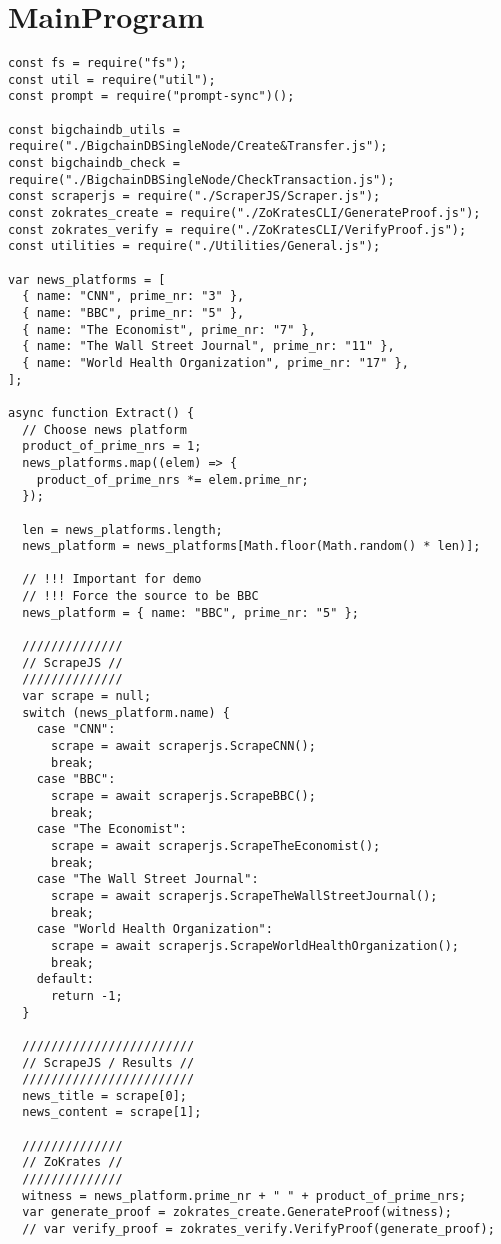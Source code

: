 \section{MainProgram}
\begin{verbatim}
const fs = require("fs");
const util = require("util");
const prompt = require("prompt-sync")();

const bigchaindb_utils = require("./BigchainDBSingleNode/Create&Transfer.js");
const bigchaindb_check = require("./BigchainDBSingleNode/CheckTransaction.js");
const scraperjs = require("./ScraperJS/Scraper.js");
const zokrates_create = require("./ZoKratesCLI/GenerateProof.js");
const zokrates_verify = require("./ZoKratesCLI/VerifyProof.js");
const utilities = require("./Utilities/General.js");

var news_platforms = [
  { name: "CNN", prime_nr: "3" },
  { name: "BBC", prime_nr: "5" },
  { name: "The Economist", prime_nr: "7" },
  { name: "The Wall Street Journal", prime_nr: "11" },
  { name: "World Health Organization", prime_nr: "17" },
];

async function Extract() {
  // Choose news platform
  product_of_prime_nrs = 1;
  news_platforms.map((elem) => {
    product_of_prime_nrs *= elem.prime_nr;
  });

  len = news_platforms.length;
  news_platform = news_platforms[Math.floor(Math.random() * len)];

  // !!! Important for demo
  // !!! Force the source to be BBC
  news_platform = { name: "BBC", prime_nr: "5" };

  //////////////
  // ScrapeJS //
  //////////////
  var scrape = null;
  switch (news_platform.name) {
    case "CNN":
      scrape = await scraperjs.ScrapeCNN();
      break;
    case "BBC":
      scrape = await scraperjs.ScrapeBBC();
      break;
    case "The Economist":
      scrape = await scraperjs.ScrapeTheEconomist();
      break;
    case "The Wall Street Journal":
      scrape = await scraperjs.ScrapeTheWallStreetJournal();
      break;
    case "World Health Organization":
      scrape = await scraperjs.ScrapeWorldHealthOrganization();
      break;
    default:
      return -1;
  }

  ////////////////////////
  // ScrapeJS / Results //
  ////////////////////////
  news_title = scrape[0];
  news_content = scrape[1];

  //////////////
  // ZoKrates //
  //////////////
  witness = news_platform.prime_nr + " " + product_of_prime_nrs;
  var generate_proof = zokrates_create.GenerateProof(witness);
  // var verify_proof = zokrates_verify.VerifyProof(generate_proof);


\end{verbatim}
